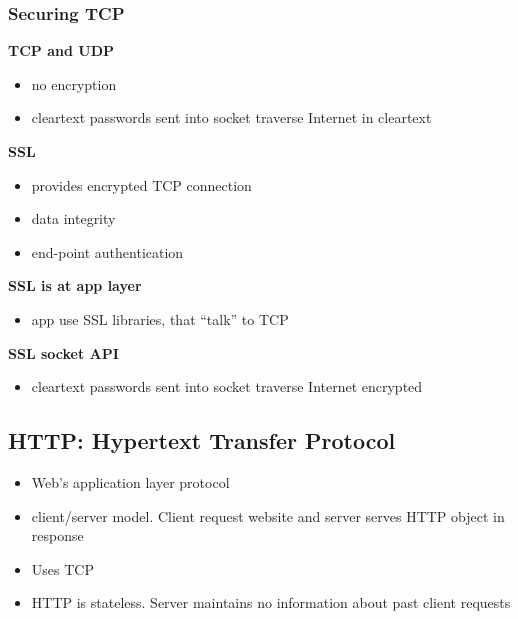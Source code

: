 \subsubsection{Securing TCP}
\textbf{TCP and UDP}
\begin{itemize}
	\item no encryption
	\item cleartext passwords sent into socket traverse Internet in cleartext
\end{itemize}
\textbf{SSL}
\begin{itemize}
	\item provides encrypted TCP connection
	\item data integrity
	\item end-point authentication
\end{itemize}
\textbf{SSL is at app layer}
\begin{itemize}
	\item app use SSL libraries, that ``talk'' to TCP
\end{itemize}
\textbf{SSL socket API}
\begin{itemize}
	\item cleartext passwords sent into socket traverse Internet encrypted
\end{itemize}

\subsection{HTTP: Hypertext Transfer Protocol}
\begin{itemize}
	\item Web's application layer protocol
	\item client/server model. Client request website and server serves HTTP object in response
	\item Uses TCP
	\item HTTP is stateless. Server maintains no information about past client requests
\end{itemize}